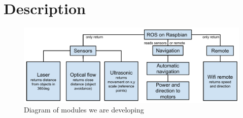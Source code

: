 \section{Description}

\begin{figure}[H]
	\centering
	\includegraphics[scale=.7]{images/developmentdiagram.pdf}
	\caption{Diagram of modules we are developing}
	\label{fig:developmentdiagram}
\end{figure}